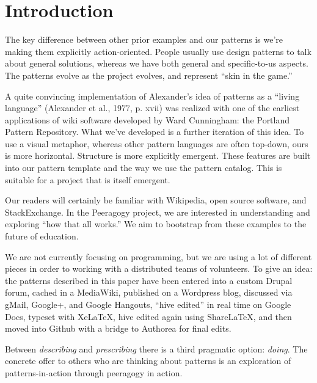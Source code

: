 \section{Introduction}

The key difference between other prior examples and our patterns is we're making them explicitly action-oriented.  People usually use design patterns to talk about general solutions, whereas we have both general and specific-to-us aspects. The patterns evolve as the project evolves, and represent ``skin in the game.''

A quite convincing implementation of Alexander’s idea of patterns as a “living language” (Alexander et
al., 1977, p. xvii) was realized with one of the earliest applications of wiki
software developed by Ward Cunningham: the Portland Pattern Repository.
What we've developed is a further iteration of this idea. To use a visual metaphor, whereas other pattern languages are often top-down, ours is more horizontal.  Structure is more explicitly emergent.  These features are built
into our pattern template and the way we use the pattern catalog.  This is suitable for a project
that is itself emergent.

Our readers will certainly be familiar with Wikipedia, open source
software, and StackExchange.  In the Peeragogy project, we are interested in
understanding and exploring ``how that all works.''  We aim to bootstrap from these examples to the future of education.

We are not currently focusing on programming, but we are using a lot of different pieces in order to working with a distributed teams of volunteers.  To give an idea: the patterns described in this paper have been entered into a custom Drupal forum, cached in a MediaWiki, published on a Wordpress blog, discussed via gMail, Google+, and Google Hangouts, ``hive edited'' in real time on Google Docs, typeset with XeLaTeX, hive edited again using ShareLaTeX, and then moved into Github with a bridge to Authorea for final edits.

Between \emph{describing} and \emph{prescribing} there is a third pragmatic option: \emph{doing}.
The concrete offer to others who are thinking about patterns is an exploration of patterns-in-action
through peeragogy in action.